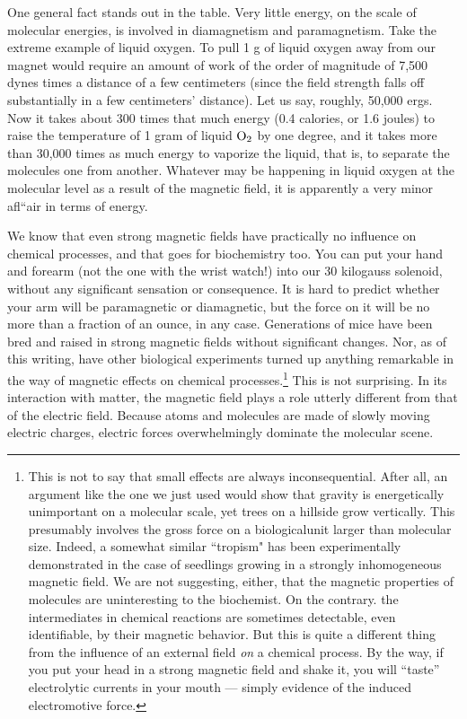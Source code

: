 One general fact stands out in the table. Very little energy, on the
scale of molecular energies, is involved in diamagnetism and 
paramagnetism. Take the extreme example of liquid oxygen. To pull
1 g of liquid oxygen away from our magnet would require an
amount of work of the order of magnitude of 7,500 dynes times a
distance of a few centimeters (since the field strength falls off substantially
in a few centimeters' distance). Let us say, roughly,
50,000 ergs. Now it takes about 300 times that much energy (0.4
calories, or 1.6 joules) to raise the temperature of 1 gram of liquid $\textup{O}_2$
by one degree, and it takes more than 30,000 times as much energy
to vaporize the liquid, that is, to separate the molecules one from
another. Whatever may be happening in liquid oxygen at the molecular
level as a result of the magnetic field, it is apparently a very minor
afl``air in terms of energy.

We know that even strong magnetic fields have practically no
influence on chemical processes, and that goes for biochemistry too.
You can put your hand and forearm (not the one with the wrist
watch!) into our 30 kilogauss solenoid, without any significant
sensation or consequence. It is hard to predict whether your arm
will be paramagnetic or diamagnetic, but the force on it will be no
more than a fraction of an ounce, in any case. Generations of mice
have been bred and raised in strong magnetic fields without significant
changes. Nor, as of this writing, have other biological experiments
turned up anything remarkable in the way of magnetic effects
on chemical processes.\footnote{
This is not to say that small effects are always inconsequential. After all, an argument
like the one we just used would show that gravity is energetically unimportant
on a molecular scale, yet trees on a hillside grow vertically. This presumably involves
the gross force on a biologicalunit larger than molecular size. Indeed, a somewhat
similar ``tropism" has been experimentally demonstrated in the case of seedlings growing
in a strongly inhomogeneous magnetic field. We are not suggesting, either, that
the magnetic properties of molecules are uninteresting to the biochemist. On the
contrary. the intermediates in chemical reactions are sometimes detectable, even 
identifiable, by their magnetic behavior. But this is quite a different thing from the influence
of an external field \emph{on} a chemical process. By the way, if you put your head in a
strong magnetic field and shake it, you will ``taste'' electrolytic currents in your mouth
--- simply evidence of the induced electromotive force.} This is not surprising. In its interaction
with matter, the magnetic field plays a role utterly different from that
of the electric field. Because atoms and molecules are made of
slowly moving electric charges, electric forces overwhelmingly
dominate the molecular scene.

